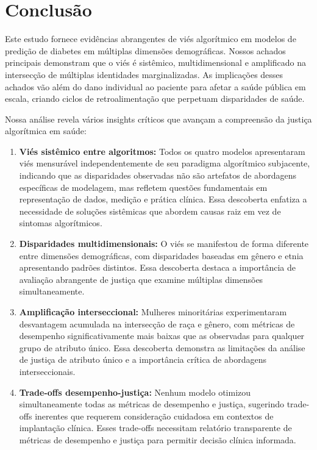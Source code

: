 
\section{Conclusão}

Este estudo fornece evidências abrangentes de viés algorítmico em modelos 
de predição de diabetes em múltiplas dimensões demográficas. Nossos achados 
principais demonstram que o viés é sistêmico, multidimensional e amplificado 
na intersecção de múltiplas identidades marginalizadas. As implicações 
desses achados vão além do dano individual ao paciente para afetar a saúde 
pública em escala, criando ciclos de retroalimentação que perpetuam 
disparidades de saúde.

Nossa análise revela vários insights críticos que avançam a compreensão 
da justiça algorítmica em saúde:

\begin{enumerate}[leftmargin=*]
    \item \textbf{Viés sistêmico entre algoritmos:} Todos os quatro modelos 
          apresentaram viés mensurável independentemente de seu paradigma 
          algorítmico subjacente, indicando que as disparidades observadas 
          não são artefatos de abordagens específicas de modelagem, mas 
          refletem questões fundamentais em representação de dados, medição 
          e prática clínica. Essa descoberta enfatiza a necessidade de 
          soluções sistêmicas que abordem causas raiz em vez de sintomas 
          algorítmicos.
    \item \textbf{Disparidades multidimensionais:} O viés se manifestou de 
          forma diferente entre dimensões demográficas, com disparidades 
          baseadas em gênero e etnia apresentando padrões distintos. Essa 
          descoberta destaca a importância de avaliação abrangente de justiça 
          que examine múltiplas dimensões simultaneamente.
    \item \textbf{Amplificação interseccional:} Mulheres minoritárias 
          experimentaram desvantagem acumulada na intersecção de raça e 
          gênero, com métricas de desempenho significativamente mais baixas 
          que as observadas para qualquer grupo de atributo único. Essa 
          descoberta demonstra as limitações da análise de justiça de 
          atributo único e a importância crítica de abordagens interseccionais.
    \item \textbf{Trade-offs desempenho-justiça:} Nenhum modelo otimizou 
          simultaneamente todas as métricas de desempenho e justiça, 
          sugerindo trade-offs inerentes que requerem consideração cuidadosa 
          em contextos de implantação clínica. Esses trade-offs necessitam 
          relatório transparente de métricas de desempenho e justiça para 
          permitir decisão clínica informada.
\end{enumerate}

